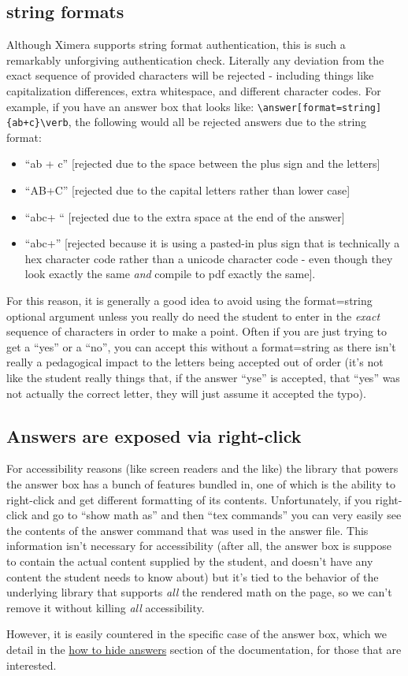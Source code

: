 \documentclass{ximera}
\begin{document}
        \subsection*{string formats}
            Although Ximera supports string format authentication, this is such a remarkably unforgiving authentication check. Literally any deviation from the exact sequence of provided characters will be rejected - including things like capitalization differences, extra whitespace, and different character codes. For example, if you have an answer box that looks like: \verb|\answer[format=string]{ab+c}\verb|, the following would all be rejected answers due to the string format:
            \begin{itemize}
                \item ``ab + c'' [rejected due to the space between the plus sign and the letters]
                \item ``AB+C'' [rejected due to the capital letters rather than lower case]
                \item ``abc+ `` [rejected due to the extra space at the end of the answer]
                \item ``abc+'' [rejected because it is using a pasted-in plus sign that is technically a hex character code rather than a unicode character code - even though they look exactly the same \textit{and} compile to pdf exactly the same].
            \end{itemize}
            For this reason, it is generally a good idea to avoid using the format=string optional argument unless you really do need the student to enter in the \textit{exact} sequence of characters in order to make a point. Often if you are just trying to get a ``yes'' or a ``no'', you can accept this without a format=string as there isn't really a pedagogical impact to the letters being accepted out of order (it's not like the student really things that, if the answer ``yse'' is accepted, that ``yes'' was not actually the correct letter, they will just assume it accepted the typo).

        
        \subsection*{Answers are exposed via right-click}
            
            For accessibility reasons (like screen readers and the like) the library that powers the answer box has a bunch of features bundled in, one of which is the ability to right-click and get different formatting of its contents. Unfortunately, if you right-click and go to ``show math as'' and then ``tex commands'' you can very easily see the contents of the answer command that was used in the answer file. This information isn't necessary for accessibility (after all, the answer box is suppose to contain the actual content supplied by the student, and doesn't have any content the student needs to know about) but it's tied to the behavior of the underlying library that supports \textit{all} the rendered math on the page, so we can't remove it without killing \textit{all} accessibility.
            
            However, it is easily countered in the specific case of the answer box, which we detail in the \href{https://xronos.clas.ufl.edu/examples/exampleCore/supplemental/hiddenAnswers}{how to hide answers} section of the documentation, for those that are interested.
        

    
\end{document}
